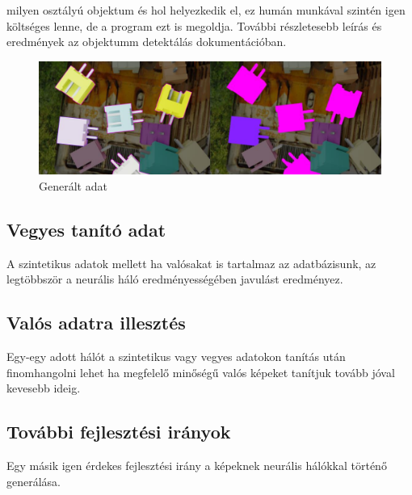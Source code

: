 \documentclass{article}
\begin{document}
milyen osztályú objektum és hol helyezkedik el, ez humán munkával szintén 
igen költséges lenne, de a program ezt is megoldja. További részletesebb leírás és eredmények 
az objektumm detektálás dokumentációban.
\begin{figure}[h]
  \centering
  \includegraphics*[scale=0.5]{data.png}
  \caption{Generált adat}
\end{figure}
\subsection{Vegyes tanító adat}
A szintetikus adatok mellett ha valósakat is tartalmaz az adatbázisunk, 
az legtöbbször a neurális háló eredményességében javulást eredményez.
\subsection{Valós adatra illesztés}
Egy-egy adott hálót a szintetikus vagy vegyes adatokon tanítás után 
finomhangolni lehet ha megfelelő minőségű valós képeket tanítjuk tovább 
jóval kevesebb ideig.
\subsection{További fejlesztési irányok}
Egy másik igen érdekes fejlesztési irány a képeknek neurális hálókkal 
történő generálása.
\end{document}
